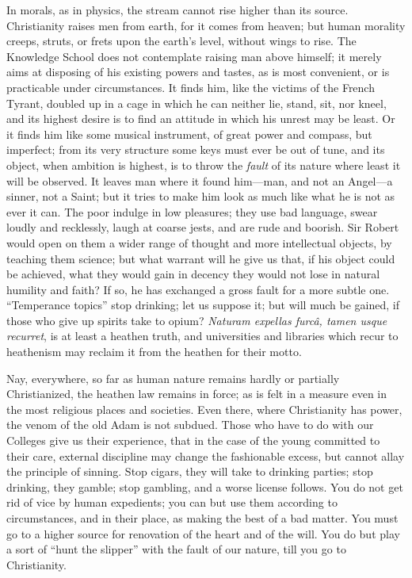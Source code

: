 In morals, as in physics, the stream cannot rise higher than its
source. Christianity raises men from earth, for it comes from heaven;
but human morality creeps, struts, or frets upon the earth's level,
without wings to rise. The Knowledge School does not contemplate
raising man above himself; it merely aims at disposing of his existing
powers and tastes, as is most convenient, or is practicable under
circumstances. It finds him, like the victims of the French Tyrant,
doubled up in a cage in which he can neither lie, stand, sit, nor
kneel, and its highest desire is to find an attitude in which his
unrest may be least. Or it finds him like some musical instrument,
of great power and compass, but imperfect; from its very
structure some keys must ever be out of tune, and its object, when
ambition is highest, is to throw the \emph{fault} of its nature where
least it will be observed. It leaves man where it found him—man, and
not an Angel—a sinner, not a Saint; but it tries to make him look as
much like what he is not as ever it can. The poor indulge in low
pleasures; they use bad language, swear loudly and recklessly, laugh
at coarse jests, and are rude and boorish. Sir Robert would open on
them a wider range of thought and more intellectual objects, by
teaching them science; but what warrant will he give us that, if his
object could be achieved, what they would gain in decency they would
not lose in natural humility and faith? If so, he has exchanged a
gross fault for a more subtle one. ``Temperance topics'' stop
drinking; let us suppose it; but will much be gained, if those who
give up spirits take to opium? \emph{Naturam expellas furcâ, tamen usque
recurret}, is at least a heathen truth, and universities and
libraries which recur to heathenism may reclaim it from the heathen
for their motto.

Nay, everywhere, so far as human nature remains hardly or partially
Christianized, the heathen law remains in force; as is felt in a
measure even in the most religious places and societies. Even there,
where Christianity has power, the venom of the old Adam is not
subdued. Those who have to do with our Colleges give us their
experience, that in the case of the young committed to their care,
external discipline may change the fashionable excess, but cannot
allay the principle of sinning. Stop cigars, they will take to
drinking parties; stop drinking, they gamble; stop gambling, and a
worse license follows. You do not get rid of vice by human expedients;
you can but use them according to circumstances, and in their
place, as making the best of a bad matter. You must go to a higher
source for renovation of the heart and of the will. You do but play a
sort of ``hunt the slipper'' with the fault of our nature,
till you go to Christianity.

